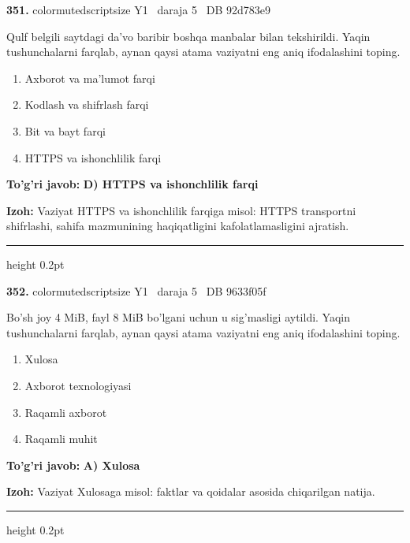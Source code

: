 \documentclass[10pt,a4paper,oneside]{article}
\begin{document}
\noindent\textbf{\color{ink}351.}  {color{muted}scriptsize Y1 \textbullet\ daraja 5 \textbullet\ DB 92d783e9}
\par
Qulf belgili saytdagi da'vo baribir boshqa manbalar bilan tekshirildi. Yaqin tushunchalarni farqlab, aynan qaysi atama vaziyatni eng aniq ifodalashini toping.
\begin{enumerate}[label=\Alph*),leftmargin=9mm]
\item Axborot va ma'lumot farqi
\item Kodlash va shifrlash farqi
\item Bit va bayt farqi
\item HTTPS va ishonchlilik farqi
\end{enumerate}
\begin{tcolorbox}[enhanced,breakable,colback=teal!4,colframe=teal!50!black,boxrule=0.5pt,arc=1.1mm,left=3mm,right=3mm,top=1.7mm,bottom=1.7mm,before skip=2mm,after skip=2mm]
\textbf{\color{teal}To'g'ri javob:} \textbf{D) HTTPS va ishonchlilik farqi}
\par\smallskip
\textbf{Izoh:} Vaziyat HTTPS va ishonchlilik farqiga misol: HTTPS transportni shifrlashi, sahifa mazmunining haqiqatligini kafolatlamasligini ajratish.
\end{tcolorbox}
\vspace{2mm}\hrule height 0.2pt \vspace{3mm}

\noindent\textbf{\color{ink}352.}  {color{muted}scriptsize Y1 \textbullet\ daraja 5 \textbullet\ DB 9633f05f}
\par
Bo'sh joy 4 MiB, fayl 8 MiB bo'lgani uchun u sig'masligi aytildi. Yaqin tushunchalarni farqlab, aynan qaysi atama vaziyatni eng aniq ifodalashini toping.
\begin{enumerate}[label=\Alph*),leftmargin=9mm]
\item Xulosa
\item Axborot texnologiyasi
\item Raqamli axborot
\item Raqamli muhit
\end{enumerate}
\begin{tcolorbox}[enhanced,breakable,colback=teal!4,colframe=teal!50!black,boxrule=0.5pt,arc=1.1mm,left=3mm,right=3mm,top=1.7mm,bottom=1.7mm,before skip=2mm,after skip=2mm]
\textbf{\color{teal}To'g'ri javob:} \textbf{A) Xulosa}
\par\smallskip
\textbf{Izoh:} Vaziyat Xulosaga misol: faktlar va qoidalar asosida chiqarilgan natija.
\end{tcolorbox}
\vspace{2mm}\hrule height 0.2pt \vspace{3mm}
\end{document}
